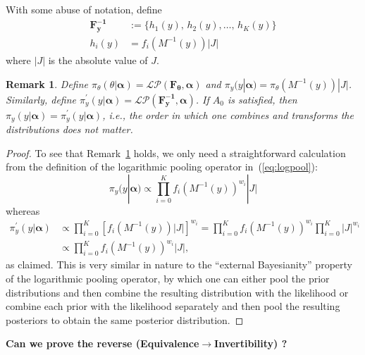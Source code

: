 \documentclass[a4paper, notitlepage, 10pt]{article}
\newtheorem{remark}{Remark}[]
\begin{document}
With some abuse of notation, define
  \begin{align}
  \label{eq:transfF}
  \mathbf{F^{-1}_y} &:= \{h_1(y), \, h_2(y), \ldots, \, h_K(y) \} \\
  h_i(y) & = f_i(M^{-1}(y))|J|\nonumber
  \end{align}
where $|J|$ is the absolute value of $J$.
\begin{remark}
\label{rmk:invariance}
Define $\pi_{\theta}(\theta | \boldsymbol\alpha) =  \mathcal{LP}(\mathbf{F_\theta}, \boldsymbol\alpha)$ and $\pi_{y}(y |\boldsymbol\alpha) = \pi_{\theta}(M^{-1}(y))|J|$.
Similarly, define $\pi^{\prime}_{y}(y|\boldsymbol\alpha) = \mathcal{LP}(\mathbf{F^{-1}_y}, \boldsymbol\alpha)$.
If $A_0$ is satisfied, then $\pi_{y}(y |\boldsymbol\alpha) = \pi^{\prime}_{y}(y|\boldsymbol\alpha)$, i.e., the order in which one combines and transforms the distributions does not matter.
\end{remark}
\begin{proof}
To see that Remark~\ref{rmk:invariance} holds, we only need a straightforward calculation from the definition of the logarithmic pooling operator in~(\ref{eq:logpool}):
\[\pi_{y}(y |\boldsymbol\alpha) \propto \prod_{i=0}^K f_i(M^{-1}(y))^{w_i}|J| \]
whereas
\begin{align*}
 \pi^{\prime}_{y}(y|\boldsymbol\alpha) &\propto  \prod_{i=0}^K \left[ f_i(M^{-1}(y))|J| \right] ^{w_i} = \prod_{i=0}^K f_i(M^{-1}(y))^{w_i} \prod_{i=0}^K|J|^{w_i}\\
 &\propto  \prod_{i=0}^K f_i(M^{-1}(y))^{w_i}|J|, %
\end{align*}
as claimed.
This is very similar in nature to the ``external Bayesianity'' property of the logarithmic pooling operator, by which one can either pool the prior distributions and then combine the resulting distribution with the likelihood or combine each prior with the likelihood separately and then pool the resulting posteriors to obtain the same posterior distribution.
\end{proof}

\textbf{\large Can we prove the reverse (Equivalence$\to$Invertibility) ?}
\end{document}
